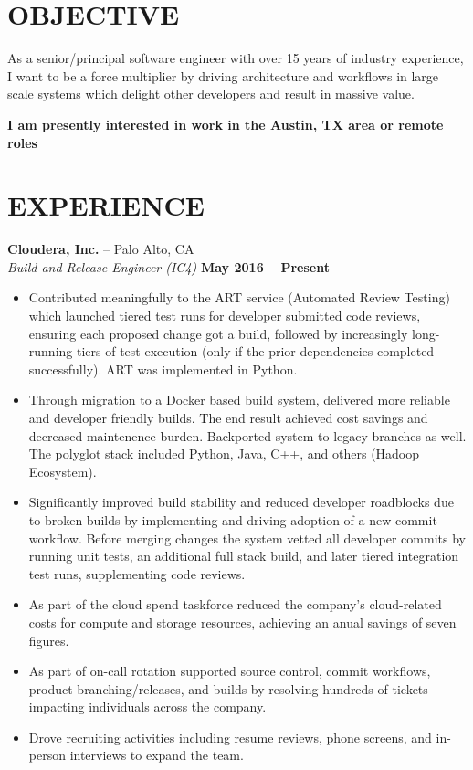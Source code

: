 \documentclass[line, margin]{res}
\begin{document}
\address{ Austin, TX $\bullet$ (206) 931-9916 $\bullet$ cmyers@cmyers.org $\bullet$ https://cmyers.org }

\begin{resume}

\section{OBJECTIVE}
As a senior/principal software engineer with over 15 years of industry
experience, I want to be a force multiplier by driving architecture and
workflows in large scale systems which delight other developers and result in
massive value.

{\bf I am presently interested in work in the Austin, TX area or remote roles}

\section{EXPERIENCE}
{\bf Cloudera, Inc.} -- Palo Alto, CA
\\
\textit{Build and Release Engineer (IC4)} \hfill {\bf May 2016 -- Present}
\\
\begin{itemize}
\item
Contributed meaningfully to the ART service (Automated Review Testing) which
launched tiered test runs for developer submitted code reviews, ensuring each
proposed change got a build, followed by increasingly long-running tiers of
test execution (only if the prior dependencies completed successfully).  ART
was implemented in Python.
\item
Through migration to a Docker based build system, delivered more reliable and
developer friendly builds.  The end result achieved cost savings and decreased
maintenence burden.  Backported system to legacy branches as well.  The
polyglot stack included Python, Java, C++, and others (Hadoop Ecosystem).
\item
Significantly improved build stability and reduced developer roadblocks due to
broken builds by implementing and driving adoption of a new commit workflow.
Before merging changes the system vetted all developer commits by
running unit tests, an additional full stack build, and later tiered
integration test runs, supplementing code reviews.
\item
As part of the cloud spend taskforce reduced the company's cloud-related costs
for compute and storage resources, achieving an anual savings of seven figures.
\item
As part of on-call rotation supported source control, commit workflows, product
branching/releases, and builds by resolving hundreds of tickets impacting
individuals across the company.
\item
Drove recruiting activities including resume reviews, phone screens,
and in-person interviews to expand the team.
\end{itemize}


\end{resume}
\end{document}
